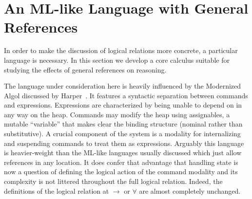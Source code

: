 \section{An ML-like Language with General References}\label{sec:language}

In order to make the discussion of logical relations more concrete, a
particular language is necessary. In this section we develop a core
calculus suitable for studying the effects of general references on
reasoning.

The language under consideration here is heavily influenced by the
Modernized Algol discussed by Harper~\citep{TODO:PFPL}. It features a
syntactic separation between commands and expressions. Expressions are
characterized by being unable to depend on in any way on the
heap. Commands may modify the heap using assignables, a mutable
``variable'' that makes clear the binding structure (nominal rather
than substitutive). A crucial component of the system is a modality
for internalizing and suspending commands to treat them as
expressions. Arguably this language is heavier-weight than the ML-like
languages usually discussed which just allow references in any
location. It does confer that advantage that handling state is now a
question of defining the logical action of the command modality and
its complexity is not littered throughout the full logical
relation. Indeed, the definitions of the logical relation at $\to$ or
$\forall$ are almost completely unchanged.

